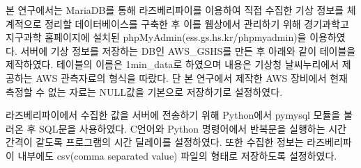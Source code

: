 본 연구에서는 MariaDB를 통해 라즈베리파이를 이용하여 직접 수집한 기상 정보를 체계적으로 정리할 데이터베이스를 구축한 후 이를 웹상에서 관리하기 위해 경기과학고 지구과학 홈페이지에 설치된 phpMyAdmin(ess.gs.hs.kr/phpmyadmin)을 이용하였다. 서버에 기상 정보를 저장하는 DB인 AWS\_GSHS를 만든 후 아래와 같이 테이블을 제작하였다. 테이블의 이름은 1min\_data로 하였으며 내용은 기상청 날씨누리에서 제공하는 AWS 관측자료의 형식을 따랐다. 단 본 연구에서 제작한 AWS 장비에서 현재 측정할 수 없는 자료는 NULL값을 기본으로 저장하기로 설정하였다.

라즈베리파이에서 수집한 값을 서버에 전송하기 위해 Python에서 pymysql 모듈을 불러온 후 SQL문을 사용하였다. C언어와 Python 명령어에서 반복문을 실행하는 시간 간격이 같도록 프로그램의 시간 딜레이를 설정하였다. 또한 수집한 정보는 라즈베리파이 내부에도 csv(comma separated value) 파일의 형태로 저장하도록 설정하였다.

